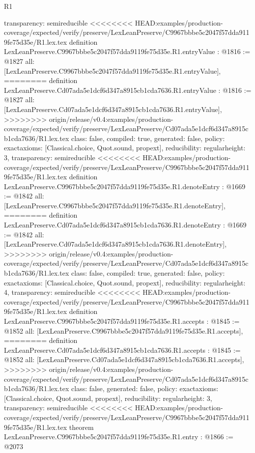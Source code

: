 \begin{lexlean}{R1}
\begin{coremodule}
{{{{{{{{{{{{{{{  transparency: semireducible
}
<<<<<<<< HEAD:examples/production-coverage/expected/verify/preserve/LexLeanPreserve/C9967bbbe5c2047f57dda9119fe75d35e/R1.lex.tex
definition LexLeanPreserve.C9967bbbe5c2047f57dda9119fe75d35e.R1.entryValue : @1816 := @1827 {
  all: [LexLeanPreserve.C9967bbbe5c2047f57dda9119fe75d35e.R1.entryValue],
========
definition LexLeanPreserve.Cd07ada5e1dcf6d347a8915cb1cda7636.R1.entryValue : @1816 := @1827 {
  all: [LexLeanPreserve.Cd07ada5e1dcf6d347a8915cb1cda7636.R1.entryValue],
>>>>>>>> origin/release/v0.4:examples/production-coverage/expected/verify/preserve/LexLeanPreserve/Cd07ada5e1dcf6d347a8915cb1cda7636/R1.lex.tex
  class: false,
  compiled: true,
  generated: false,
  policy: exact{axioms: [Classical.choice, Quot.sound, propext]},
  reducibility: regular{height: 3},
  transparency: semireducible
}
<<<<<<<< HEAD:examples/production-coverage/expected/verify/preserve/LexLeanPreserve/C9967bbbe5c2047f57dda9119fe75d35e/R1.lex.tex
definition LexLeanPreserve.C9967bbbe5c2047f57dda9119fe75d35e.R1.denoteEntry : @1669 := @1842 {
  all: [LexLeanPreserve.C9967bbbe5c2047f57dda9119fe75d35e.R1.denoteEntry],
========
definition LexLeanPreserve.Cd07ada5e1dcf6d347a8915cb1cda7636.R1.denoteEntry : @1669 := @1842 {
  all: [LexLeanPreserve.Cd07ada5e1dcf6d347a8915cb1cda7636.R1.denoteEntry],
>>>>>>>> origin/release/v0.4:examples/production-coverage/expected/verify/preserve/LexLeanPreserve/Cd07ada5e1dcf6d347a8915cb1cda7636/R1.lex.tex
  class: false,
  compiled: true,
  generated: false,
  policy: exact{axioms: [Classical.choice, Quot.sound, propext]},
  reducibility: regular{height: 4},
  transparency: semireducible
}
<<<<<<<< HEAD:examples/production-coverage/expected/verify/preserve/LexLeanPreserve/C9967bbbe5c2047f57dda9119fe75d35e/R1.lex.tex
definition LexLeanPreserve.C9967bbbe5c2047f57dda9119fe75d35e.R1.accepts : @1845 := @1852 {
  all: [LexLeanPreserve.C9967bbbe5c2047f57dda9119fe75d35e.R1.accepts],
========
definition LexLeanPreserve.Cd07ada5e1dcf6d347a8915cb1cda7636.R1.accepts : @1845 := @1852 {
  all: [LexLeanPreserve.Cd07ada5e1dcf6d347a8915cb1cda7636.R1.accepts],
>>>>>>>> origin/release/v0.4:examples/production-coverage/expected/verify/preserve/LexLeanPreserve/Cd07ada5e1dcf6d347a8915cb1cda7636/R1.lex.tex
  class: false,
  generated: false,
  policy: exact{axioms: [Classical.choice, Quot.sound, propext]},
  reducibility: regular{height: 3},
  transparency: semireducible
}
<<<<<<<< HEAD:examples/production-coverage/expected/verify/preserve/LexLeanPreserve/C9967bbbe5c2047f57dda9119fe75d35e/R1.lex.tex
theorem LexLeanPreserve.C9967bbbe5c2047f57dda9119fe75d35e.R1.entry : @1866 := @2073 {
}}}}}}}}}}}}}}}}}}
\end{coremodule}
\end{lexlean}
